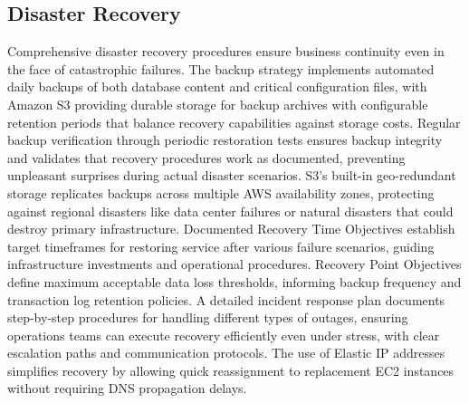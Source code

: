 \subsection{Disaster Recovery}
Comprehensive disaster recovery procedures ensure business continuity even in the face of catastrophic failures. The backup strategy implements automated daily backups of both database content and critical configuration files, with Amazon S3 providing durable storage for backup archives with configurable retention periods that balance recovery capabilities against storage costs. Regular backup verification through periodic restoration tests ensures backup integrity and validates that recovery procedures work as documented, preventing unpleasant surprises during actual disaster scenarios. S3's built-in geo-redundant storage replicates backups across multiple AWS availability zones, protecting against regional disasters like data center failures or natural disasters that could destroy primary infrastructure. Documented Recovery Time Objectives establish target timeframes for restoring service after various failure scenarios, guiding infrastructure investments and operational procedures. Recovery Point Objectives define maximum acceptable data loss thresholds, informing backup frequency and transaction log retention policies. A detailed incident response plan documents step-by-step procedures for handling different types of outages, ensuring operations teams can execute recovery efficiently even under stress, with clear escalation paths and communication protocols. The use of Elastic IP addresses simplifies recovery by allowing quick reassignment to replacement EC2 instances without requiring DNS propagation delays.